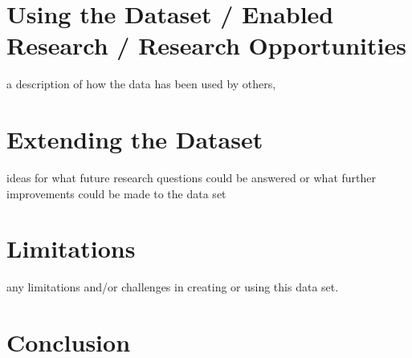 \documentclass[10pt, conference]{IEEEtran}
\begin{document}
\section{Using the Dataset / Enabled Research / Research Opportunities}
a description of how the data has been used by others,

\section{Extending the Dataset}
ideas for what future research questions could be answered or what further improvements could be made to the data set

\section{Limitations}
any limitations and/or challenges in creating or using this data set.

\section{Conclusion}



\end{document}
